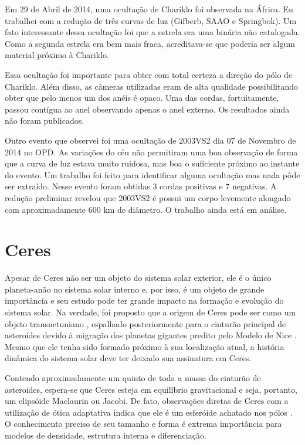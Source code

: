 \documentclass[12pt,a4paper]{monografia}
\begin{document}
Em 29 de Abril de 2014, uma ocultação de Chariklo foi observada na África. Eu trabalhei com a redução de três curvas de luz (Gifberb, SAAO e Springbok). Um fato interessante dessa ocultação foi que a estrela era uma binária não catalogada. Como a segunda estrela era bem mais fraca, acreditava-se que poderia ser algum material próximo à Chariklo.

Essa ocultação foi importante para obter com total certeza a direção do pólo de Chariklo. Além disso, as câmeras utilizadas eram de alta qualidade possibilitando obter que pelo menos um dos anéis é opaco. Uma das cordas, fortuitamente, passou contígua ao anel observando apenas o anel externo. Os resultados ainda não foram publicados.

Outro evento que observei foi uma ocultação de 2003VS2 dia 07 de Novembro de 2014 no OPD. As variações do céu não permitiram uma boa observação de forma que a curva de luz estava muito ruidosa, mas boa o suficiente próximo ao instante do evento. Um trabalho foi feito para identificar alguma ocultação mas nada pôde ser extraído. Nesse evento foram obtidas 3 cordas positivas e 7 negativas. A redução preliminar revelou que 2003VS2 é possui um corpo levemente alongado com aproximadamente 600 km de diâmetro. O trabalho ainda está em análise.



\section{Ceres}
\label{Sec: Ceres}

\indent \indent Apesar de Ceres não ser um objeto do sistema solar exterior, ele é o único planeta-anão no sistema solar interno e, por isso, é um objeto de grande importância e seu estudo pode ter grande impacto na formação e evolução do sistema solar. Na verdade, foi proposto que a origem de Ceres pode ser como um objeto transnetuniano \citep{McKinnon2012}, espalhado posteriormente para o cinturão principal de asteroides devido à migração dos planetas gigantes predito pelo Modelo de Nice \citep{Gomes2005}. Mesmo que ele tenha sido formado próximo à sua localização atual, a história dinâmica do sistema solar deve ter deixado sua assinatura em Ceres.

Contendo aproximadamente um quinto de toda a massa do cinturão de asteroides, espera-se que Ceres esteja em equilíbrio gravitacional e seja, portanto, um elipsóide Maclaurin ou Jacobi. De fato, observações diretas de Ceres com a utilização de ótica adaptativa indica que ele é um esferóide achatado nos pólos \citep{Drummond2014}. O conhecimento preciso de seu tamanho e forma é extrema importância para modelos de densidade, estrutura interna e diferenciação.
\end{document}
